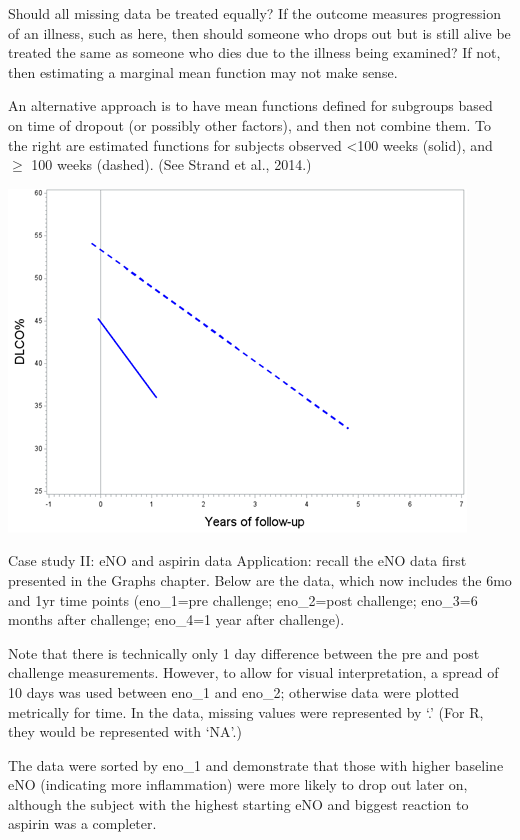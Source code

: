 \documentclass[
  9pt,
  ignorenonframetext,
]{beamer}
\begin{document}
\begin{frame}{}
\protect\hypertarget{section-12}{}
Should all missing data be treated equally? If the outcome measures
progression of an illness, such as here, then should someone who drops
out but is still alive be treated the same as someone who dies due to
the illness being examined? If not, then estimating a marginal mean
function may not make sense.

An alternative approach is to have mean functions defined for subgroups
based on time of dropout (or possibly other factors), and then not
combine them. To the right are estimated functions for subjects observed
\textless100 weeks (solid), and \(\geq\) 100 weeks (dashed). (See Strand
et al., 2014.)

\begin{center}\includegraphics[width=0.7\linewidth]{figs_L20/f11} \end{center}
\end{frame}

\begin{frame}{}
\protect\hypertarget{section-13}{}
\begin{block}{Case study II: eNO and aspirin data}
\protect\hypertarget{case-study-ii-eno-and-aspirin-data}{}
Application: recall the eNO data first presented in the Graphs chapter.
Below are the data, which now includes the 6mo and 1yr time points
(eno\_1=pre challenge; eno\_2=post challenge; eno\_3=6 months after
challenge; eno\_4=1 year after challenge).

Note that there is technically only 1 day difference between the pre and
post challenge measurements. However, to allow for visual
interpretation, a spread of 10 days was used between eno\_1 and eno\_2;
otherwise data were plotted metrically for time. In the data, missing
values were represented by `.' (For R, they would be represented with
`NA'.)

The data were sorted by eno\_1 and demonstrate that those with higher
baseline eNO (indicating more inflammation) were more likely to drop out
later on, although the subject with the highest starting eNO and biggest
reaction to aspirin was a completer.
\end{block}
\end{frame}
\end{document}

